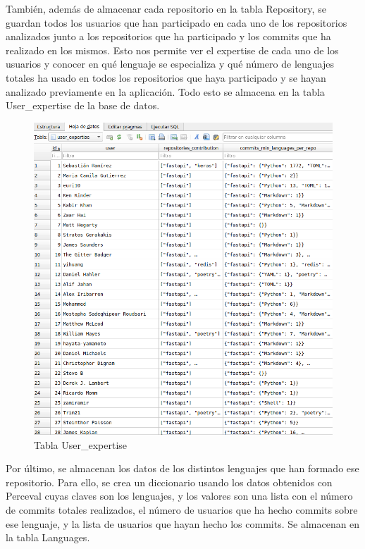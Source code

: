 \documentclass[a4paper, 12pt]{book}
\begin{document}
También, además de almacenar cada repositorio en la tabla Repository, se guardan todos los usuarios que han participado en cada uno de los repositorios analizados junto a los repositorios que ha participado y los commits que ha realizado en los mismos. Esto nos permite ver el expertise de cada uno de los usuarios y conocer en qué lenguaje se especializa y qué número de lenguajes totales ha usado en todos los repositorios que haya participado y se hayan analizado previamente en la aplicación. Todo esto se almacena en la tabla User\_expertise de la base de datos.

\begin{figure}[H]
  \centering
  \includegraphics[width=1\textwidth]{img/tablauser_expertise.png}
  \caption{Tabla User\_expertise}
  \label{figura:tablaue}
\end{figure}

Por último, se almacenan los datos de los distintos lenguajes que han formado ese repositorio. Para ello, se crea un diccionario usando los datos obtenidos con Perceval cuyas claves son los lenguajes, y los valores son una lista con el número de commits totales realizados, el número de usuarios que ha hecho commits sobre ese lenguaje, y la lista de usuarios que hayan hecho los commits. Se almacenan en la tabla Languages.
\end{document}
